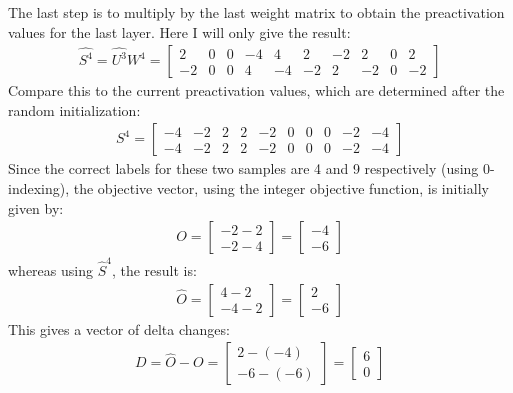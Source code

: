 The last step is to multiply by the last weight matrix to obtain the preactivation values for the last layer. Here I will only give the result:
\begin{align*}
    \hat{S^4} = \hat{U^3}W^4 = 
    \begin{bmatrix}
        2 & 0 & 0 & -4 & 4 & 2 & -2 & 2 & 0 & 2 \\
        -2 & 0 & 0 & 4 & -4 & -2 & 2 & -2 & 0 & -2
    \end{bmatrix}
\end{align*}
Compare this to the current preactivation values, which are determined after the random initialization:
\begin{align*}
    S^4 = 
    \begin{bmatrix}
        -4 & -2 & 2 & 2 & -2 & 0 & 0 & 0 & -2 & -4 \\
        -4 & -2 & 2 & 2 & -2 & 0 & 0 & 0 & -2 & -4
    \end{bmatrix}
\end{align*}
Since the correct labels for these two samples are 4 and 9 respectively (using 0-indexing), the objective vector, using the integer objective function, is initially given by:
\begin{align*}
    O = 
    \begin{bmatrix}
        -2 - 2 \\
        -2 - 4 
    \end{bmatrix}
    = 
    \begin{bmatrix}
        -4 \\
        -6 
    \end{bmatrix}
\end{align*}
whereas using $\hat{S}^4$, the result is:
\begin{align*}
    \hat{O} = 
    \begin{bmatrix}
        4 - 2 \\
        -4 -2 
    \end{bmatrix}
    = 
    \begin{bmatrix}
        2 \\
        -6 
    \end{bmatrix}
\end{align*}
This gives a vector of delta changes:
\begin{align*}
    D = \hat{O} - O = 
    \begin{bmatrix}
        2 - (-4) \\
        -6 - (-6) 
    \end{bmatrix}
    = 
    \begin{bmatrix}
        6 \\ 
        0 
    \end{bmatrix}
\end{align*}
